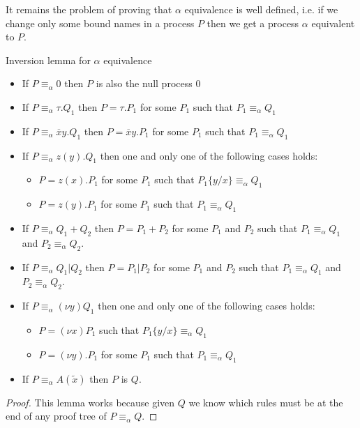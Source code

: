 It remains the problem of proving that $\alpha$ equivalence is well defined, i.e. if we change only some bound names in a process $P$ then we get a process $\alpha$ equivalent to $P$. 


\begin{lemma}
  Inversion lemma for $\alpha$ equivalence
  \begin{itemize}
    \item 	
      If $P\equiv_{\alpha}0$ then $P$ is also the null process $0$
    \item
      If $P\equiv_{\alpha} \tau.Q_{1}$ then $P=\tau.P_{1}$ for some $P_{1}$ such that $P_{1}\equiv_{\alpha}Q_{1}$
    \item
      If $P\equiv_{\alpha} \overline{x}y.Q_{1}$ then $P=\overline{x}y.P_{1}$ for some $P_{1}$ such that $P_{1}\equiv_{\alpha}Q_{1}$
    \item
      If $P\equiv_{\alpha} z(y).Q_{1}$ then one and only one of the following cases holds:
      \begin{itemize}
	\item 
	  $P=z(x).P_{1}$ for some $P_{1}$ such that $P_{1}\{y/x\}\equiv_{\alpha}Q_{1}$
	\item
	  $P=z(y).P_{1}$ for some $P_{1}$ such that $P_{1}\equiv_{\alpha}Q_{1}$
      \end{itemize}
    \item
      If $P\equiv_{\alpha} Q_{1}+Q_{2}$ then $P=P_{1}+P_{2}$ for some $P_{1}$ and $P_{2}$ such that $P_{1}\equiv_{\alpha}Q_{1}$ and $P_{2}\equiv_{\alpha}Q_{2}$.
    \item 
      If $P\equiv_{\alpha} Q_{1}|Q_{2}$ then $P=P_{1}|P_{2}$ for some $P_{1}$ and $P_{2}$ such that $P_{1}\equiv_{\alpha}Q_{1}$ and $P_{2}\equiv_{\alpha}Q_{2}$.
    \item 
      If $P\equiv_{\alpha} (\nu y)Q_{1}$ then one and only one of the following cases holds:
      \begin{itemize}
	\item
	  $P=(\nu x)P_{1}$ such that $P_{1}\{y/x\}\equiv_{\alpha}Q_{1}$
	\item
	  $P=(\nu y).P_{1}$ for some $P_{1}$ such that $P_{1}\equiv_{\alpha}Q_{1}$
      \end{itemize}
    \item 
      If $P\equiv_{\alpha} A(\tilde{x})$ then $P$ is $Q$.
  \end{itemize}
    \begin{proof}
      This lemma works because given $Q$ we know which rules must be at the end of any proof tree of $P\equiv_{\alpha}Q$.
    \end{proof}
\end{lemma}

